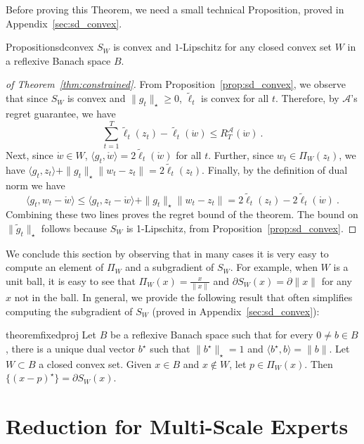 \documentclass[12pt]{colt2018} %
\newcommand{\ol}{\mathcal{A}}
\newcommand{\w}{\mathring{w}}
\begin{document}
Before proving this Theorem, we need a small technical Proposition, proved in Appendix~\ref{sec:sd_convex}.
\begin{restatable}{Proposition}{sdconvex}
\label{prop:sd_convex}
$S_W$ is convex and $1$-Lipschitz for any closed convex set $W$ in a reflexive Banach space $B$.
\end{restatable}
\begin{proof}[of Theorem~\ref{thm:constrained}]
From Proposition~\ref{prop:sd_convex}, we observe that since $S_W$ is convex and $\|g_t\|_\star\ge 0$, $\tilde \ell_t$ is convex for all $t$. Therefore, by $\ol$'s regret guarantee, we have
\[
\sum_{t=1}^T \tilde \ell_t(z_t)-\tilde \ell_t(\w)\le R_T^{\ol}(\w)~.
\]
Next, since $\w\in W$, $\langle g_t,\w\rangle= 2\tilde \ell_t(\w)$ for all $t$. Further, since $w_t\in \Pi_W(z_t)$, we have $\langle g_t, z_t\rangle + \|g_t\|_\star\|w_t-z_t\| = 2\tilde\ell_t(z_t)$. Finally, by the definition of dual norm we have
\[
\langle g_t, w_t-\w\rangle \le \langle g_t, z_t-\w\rangle + \|g_t\|_\star\|w_t-z_t\|=2\tilde \ell_t(z_t)-2\tilde \ell_t(\w)~.
\]
Combining these two lines proves the regret bound of the theorem. The bound on $\|\tilde{g}_t\|_\star$ follows because $S_W$ is 1-Lipschitz, from Proposition~\ref{prop:sd_convex}.
\end{proof}

We conclude this section by observing that in many cases it is very easy to compute an element of $\Pi_W$ and a subgradient of $S_W$. For example, when $W$ is a unit ball, it is easy to see that $\Pi_W(x)=\tfrac{x}{\|x\|}$ and $\partial S_W(x) = \partial \|x\|$ for any $x$ not in the ball. In general, we provide the following result that often simplifies computing the subgradient of $S_W$ (proved in Appendix~\ref{sec:sd_convex}):
\begin{restatable}{theorem}{fixedproj}\label{thm:fixedproj}
Let $B$ be a reflexive Banach space such that for every $0\ne b\in B$, there is a unique dual vector $b^\star$ such that $\|b^\star\|_\star = 1$ and $\langle b^\star ,b\rangle = \|b\|$. Let $W\subset B$ a closed convex set. Given $x\in B$ and $x\notin W$, let $p\in\Pi_W(x)$. Then $\{(x-p)^\star\} = \partial S_W(x)$.
\end{restatable}

\section{Reduction for Multi-Scale Experts}\label{sec:multiscale}
\end{document}
